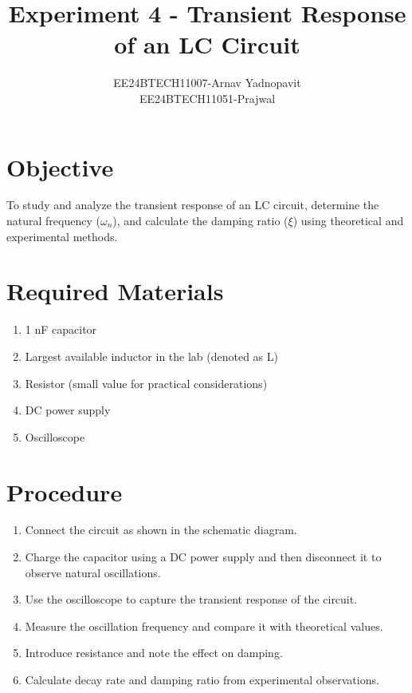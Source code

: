 \documentclass[a4paper,12pt]{article}
\begin{document}
\title{\textbf{Experiment 4 - Transient Response of an LC Circuit}}
\author{EE24BTECH11007-Arnav Yadnopavit \\ EE24BTECH11051-Prajwal}
\date{}
\maketitle

\section*{Objective}
To study and analyze the transient response of an LC circuit, determine the natural frequency ($\omega_n$), and calculate the damping ratio ($\xi$) using theoretical and experimental methods.

\section*{Required Materials}
\begin{enumerate}
    \item 1 nF capacitor
    \item Largest available inductor in the lab (denoted as L)
    \item Resistor (small value for practical considerations)
    \item DC power supply
    \item Oscilloscope
\end{enumerate}

\section*{Procedure}
\begin{enumerate}
    \item Connect the circuit as shown in the schematic diagram.
    \item Charge the capacitor using a DC power supply and then disconnect it to observe natural oscillations.
    \item Use the oscilloscope to capture the transient response of the circuit.
    \item Measure the oscillation frequency and compare it with theoretical values.
    \item Introduce resistance and note the effect on damping.
    \item Calculate decay rate and damping ratio from experimental observations.
\end{enumerate}
\end{document}
